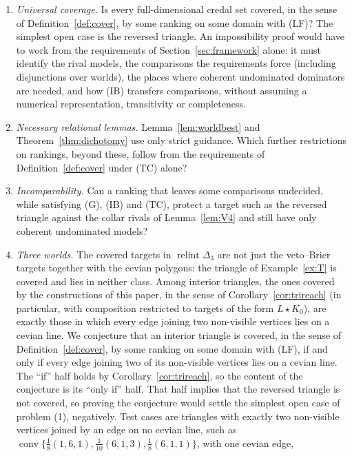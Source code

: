 \documentclass[11pt]{article}
\DeclareMathOperator{\conv}{conv}
\DeclareMathOperator{\relint}{relint}
\theoremstyle{plain}
\theoremstyle{definition}
\theoremstyle{remark}
\begin{document}
\begin{enumerate}[label=(\arabic*)]
  \item \emph{Universal coverage.} Is every full-dimensional credal set covered, in the
  sense of Definition~\ref{def:cover}, by some ranking on some domain with (LF)? The
  simplest open case is the reversed triangle. An impossibility proof would have to work
  from the requirements of Section~\ref{sec:framework} alone: it must identify the rival
  models, the comparisons the requirements force (including disjunctions over worlds), the
  places where coherent undominated dominators are needed, and how (IB) transfers
  comparisons, without assuming a numerical representation, transitivity or completeness.
  \item \emph{Necessary relational lemmas.} Lemma~\ref{lem:worldbest} and
  Theorem~\ref{thm:dichotomy} use only strict guidance. Which further restrictions on
  rankings, beyond these, follow from the requirements of Definition~\ref{def:cover}
  under (TC) alone?
  \item \emph{Incomparability.} Can a ranking that leaves some comparisons undecided, while
  satisfying (G), (IB) and (TC), protect a target such as the reversed triangle against
  the collar rivals of Lemma~\ref{lem:V4} and still have only coherent undominated models?
  \item \emph{Three worlds.} The covered targets in $\relint\Delta_3$ are not just the
  veto--Brier targets together with the cevian polygons: the triangle of
  Example~\ref{ex:T} is covered and lies in neither class. Among interior triangles, the
  ones covered by the constructions of this paper, in the sense of
  Corollary~\ref{cor:trireach} (in particular, with composition restricted to targets of
  the form $L\star K_0$), are exactly those in which every edge joining two non-visible
  vertices lies on a cevian line.
  We conjecture that an interior triangle is covered, in the sense of
  Definition~\ref{def:cover}, by some ranking on some domain with (LF), if and only if
  every edge joining two of its non-visible vertices lies on a cevian line. The ``if''
  half holds by Corollary~\ref{cor:trireach}, so the content of the conjecture is its
  ``only if'' half. That half implies that the reversed triangle is not covered, so proving
  the conjecture would settle the simplest open case of problem (1), negatively. Test cases are
  triangles with exactly two non-visible vertices joined by an edge on no cevian line,
  such as $\conv\{\frac18(1,6,1),\frac1{10}(6,1,3),\frac18(6,1,1)\}$, with one cevian edge,

\end{enumerate}
\end{document}
